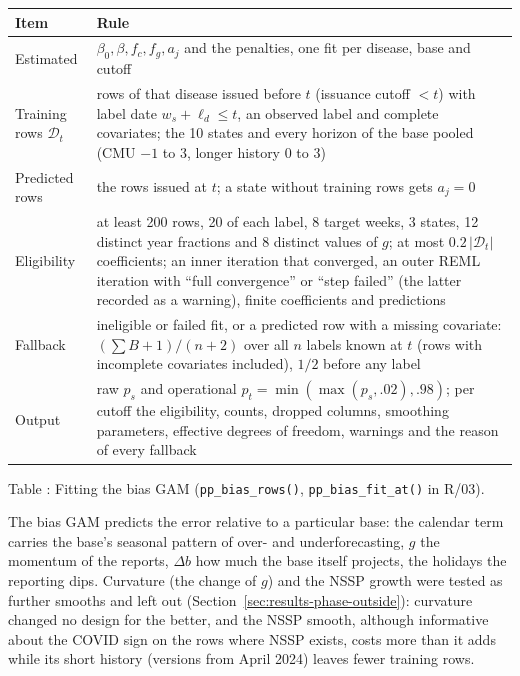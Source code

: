\documentclass[11pt,a4paper]{article}
\theoremstyle{definition}
\theoremstyle{remark}
\begin{document}
\begin{center}
\small
\begin{tabularx}{\linewidth}{@{}p{3cm}X@{}}
\toprule
Item & Rule\\
\midrule
Estimated & $\beta_0,\beta,f_c,f_g,a_j$ and the penalties, one fit per
disease, base and cutoff\\
Training rows $\mathcal D_t$ & rows of that disease issued before $t$
(issuance cutoff $<t$) with label date $w_s+\ell_d\le t$, an observed label
and complete covariates; the 10 states and every horizon of the base pooled
(CMU $-1$ to 3, longer history 0 to 3)\\
Predicted rows & the rows issued at $t$; a state without training rows gets
$a_j=0$\\
Eligibility & at least 200 rows, 20 of each label, 8 target weeks, 3
states, 12 distinct year fractions and 8 distinct values of $g$; at most
$0.2\,|\mathcal D_t|$ coefficients; an inner iteration that converged, an
outer REML iteration with ``full convergence'' or ``step failed'' (the latter
recorded as a warning), finite coefficients and predictions\\
Fallback & ineligible or failed fit, or a predicted row with a missing
covariate: $(\sum B+1)/(n+2)$ over all $n$ labels known at $t$ (rows with
incomplete covariates included), $1/2$ before any label\\
Output & raw $p_s$ and operational $p_t=\min(\max(p_s,.02),.98)$; per cutoff
the eligibility, counts, dropped columns, smoothing parameters, effective
degrees of freedom, warnings and the reason of every fallback\\
\bottomrule
\end{tabularx}
\end{center}
\label{tab:bias-fitting}
\begin{center}\small Table \thetable: Fitting the bias GAM
(\texttt{pp\_bias\_rows()}, \texttt{pp\_bias\_fit\_at()} in R/03).
\end{center}

The bias GAM predicts the error relative to a particular base: the
calendar term carries the base's seasonal pattern of over- and
underforecasting, $g$ the momentum of the reports, $\Delta b$ how much the
base itself projects, the holidays the reporting dips. Curvature (the
change of $g$) and the NSSP growth were tested as further smooths and left
out (Section~\ref{sec:results-phase-outside}): curvature changed no design
for the better, and the NSSP smooth, although informative about the COVID
sign on the rows where NSSP exists, costs more than it adds while its short
history (versions from April 2024) leaves fewer training rows.
\end{document}
